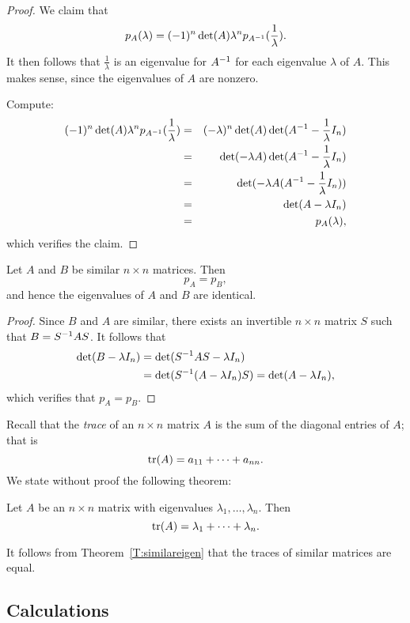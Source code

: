 \documentclass{ximera}
\begin{document}
\begin{proof}  We claim that  
\[
p_A(\lambda) = (-1)^n \det(A) \lambda^n p_{A^{-1}}(\frac{1}{\lambda}).
\]
It then follows that $\frac{1}{\lambda}$ is an eigenvalue for
$A^{-1}$ for each eigenvalue $\lambda$ of $A$.  This makes sense,
since the eigenvalues of $A$ are nonzero. 

Compute:
\begin{eqnarray*}
(-1)^n \det(A) \lambda^n p_{A^{-1}}(\frac{1}{\lambda}) & = &
 (-\lambda)^n \det(A)\det(A^{-1}-\frac{1}{\lambda}I_n) \\
& = & \det(-\lambda A)\det(A^{-1}-\frac{1}{\lambda}I_n)\\
& = & \det(-\lambda A (A^{-1}-\frac{1}{\lambda}I_n))\\
& = & \det(A-\lambda I_n) \\
& = & p_A(\lambda),
\end{eqnarray*}
which verifies the claim.  \end{proof}

\begin{theorem}  \label{T:similareigen}
Let $A$ and $B$ be similar $n\times n$ matrices.  Then
\[
p_A = p_B,
\]
and hence the eigenvalues of $A$ and $B$ are identical.
\end{theorem}  

\begin{proof}  Since $B$ and $A$ are similar, there exists an 
invertible $n\times n$ matrix $S$ such that $B=S^{-1} AS$.  It 
follows that 
\begin{align*}
\det(B-\lambda I_n) &= \det(S^{-1} AS-\lambda I_n) \\
&= \det(S^{-1}(A-\lambda I_n)S) = \det(A-\lambda I_n),
\end{align*}
which verifies that $p_A=p_B$.  \end{proof}

Recall that the {\em trace\/} of an 
$n\times n$ matrix $A$ is
the sum of the diagonal entries of $A$; that is
\[
{\rm tr}(A) = a_{11} +\cdots+ a_{nn}.
\]
We state without proof the following theorem:
\begin{theorem} \label{T:tracen}
Let $A$ be an $n\times n$ matrix with eigenvalues
$\lambda_1,\ldots,\lambda_n$.  Then
\[
{\rm tr}(A) = \lambda_1 + \cdots + \lambda_n.
\]
\end{theorem}

It follows from Theorem~\ref{T:similareigen} that the traces of
similar matrices are equal.


\subsection*{\Matlab Calculations}
\end{document}

